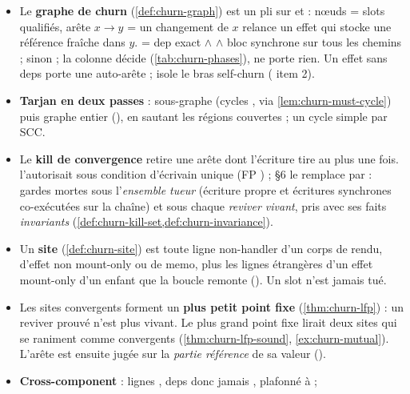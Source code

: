 \begin{resume}
\begin{itemize}
  \item Le \textbf{graphe de churn} (\cref{def:churn-graph}) est un pli sur
         et  : nœuds = slots qualifiés,
        arête $x \to y$ = \og un changement de $x$ relance un effet qui stocke une référence
        fraîche dans $y$\fg.  = dep exact $\wedge$  $\wedge$ bloc
        synchrone sur tous les chemins ;  sinon ; la colonne  décide
        (\cref{tab:churn-phases}),  ne porte rien. Un effet sans deps porte une
        auto-arête ;  isole le bras self-churn ( item 2).
  \item \textbf{Tarjan en deux passes} : sous-graphe  (cycles ,
        \Error{} via \cref{lem:churn-must-cycle}) puis graphe entier (\Warning), en sautant
        les régions couvertes ; un cycle simple par SCC.
  \item Le \textbf{kill de convergence} retire une arête dont l'écriture tire au plus une fois.
         l'autorisait sous condition d'écrivain unique (FP ) ;  \S6
        le remplace par  : gardes mortes sous
        l'\emph{ensemble tueur} (écriture propre et écritures synchrones co-exécutées sur la
        chaîne) et sous chaque \emph{reviver vivant}, pris avec ses faits
        \emph{invariants} (\cref{def:churn-kill-set,def:churn-invariance}).
  \item Un \textbf{site} (\cref{def:churn-site}) est toute ligne non-handler d'un corps de
        rendu, d'effet non mount-only ou de memo, plus les lignes étrangères d'un effet
        mount-only d'un enfant que la boucle remonte (). Un slot
         n'est jamais tué.
  \item Les sites convergents forment un \textbf{plus petit point fixe}
        (\cref{thm:churn-lfp}) : un reviver prouvé n'est plus vivant. Le plus grand point
        fixe lirait deux sites qui se raniment comme convergents (\cref{thm:churn-lfp-sound},
        \cref{ex:churn-mutual}). L'arête est ensuite jugée sur la \emph{partie référence} de
        sa valeur ().
  \item \textbf{Cross-component} : lignes , deps  donc
        jamais ,  plafonné à \Warning{} ; 

\end{itemize}
\end{resume}
